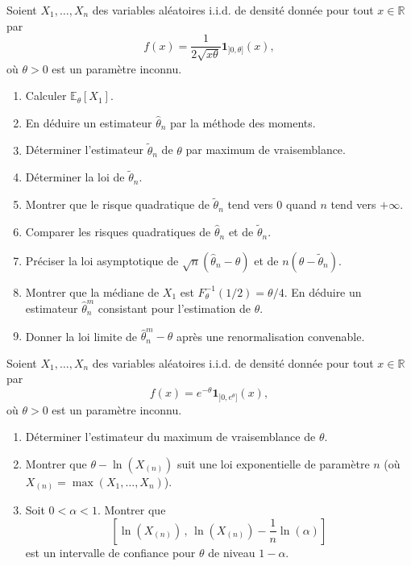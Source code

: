 \begin{mdframed}
\begin{exercice}
Soient $X_1, \dots, X_n$ des variables aléatoires i.i.d. de densité donnée pour tout $x \in \mathbb{R}$ par
\begin{equation*}
f(x) = \frac{1}{2\sqrt{x\theta}} \mathbf{1}_{]0, \theta]}(x),
\end{equation*}
où $\theta > 0$ est un paramètre inconnu.

\begin{enumerate}
    \item Calculer $\mathbb{E}_\theta[X_1]$.
    \item En déduire un estimateur $\hat{\theta}_n$ par la méthode des moments.
    \item Déterminer l'estimateur $\tilde{\theta}_n$ de $\theta$ par maximum de vraisemblance.
    \item Déterminer la loi de $\tilde{\theta}_n$.
    \item Montrer que le risque quadratique de $\tilde{\theta}_n$ tend vers 0 quand $n$ tend vers $+\infty$.
    \item Comparer les risques quadratiques de $\hat{\theta}_n$ et de $\tilde{\theta}_n$.
    \item Préciser la loi asymptotique de $\sqrt{n}(\hat{\theta}_n - \theta)$ et de $n(\theta - \tilde{\theta}_n)$.
    \item Montrer que la médiane de $X_1$ est $F_\theta^{-1}(1/2) = \theta/4$. En déduire un estimateur $\hat{\theta}_n^m$ consistant pour l'estimation de $\theta$.
    \item Donner la loi limite de $\hat{\theta}_n^m - \theta$ après une renormalisation convenable.
\end{enumerate}
\end{exercice}
\end{mdframed}

\smallskip

\begin{mdframed}
\begin{exercice}
Soient $X_1, \dots, X_n$ des variables aléatoires i.i.d. de densité donnée pour tout $x \in \mathbb{R}$ par
\begin{equation*}
f(x) = e^{-\theta} \mathbf{1}_{]0, e^\theta]}(x),
\end{equation*}
où $\theta > 0$ est un paramètre inconnu.

\begin{enumerate}
    \item Déterminer l'estimateur du maximum de vraisemblance de $\theta$.
    \item Montrer que $\theta - \ln(X_{(n)})$ suit une loi exponentielle de paramètre $n$ (où $X_{(n)} = \max(X_1, \dots, X_n)$).
    \item Soit $0 < \alpha < 1$. Montrer que 
    \begin{equation*}
    \left[ \ln(X_{(n)}) \, , \, \ln(X_{(n)}) - \frac{1}{n} \ln(\alpha) \right]
    \end{equation*}
    est un intervalle de confiance pour $\theta$ de niveau $1 - \alpha$.
\end{enumerate}
\end{exercice}
\end{mdframed}

